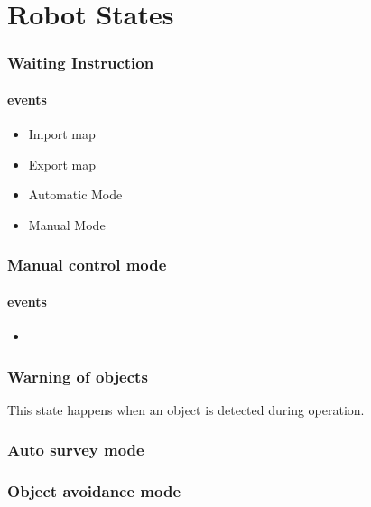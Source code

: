 \documentclass[10pt,a4paper]{article}
\begin{document}
\part{Robot States}
\section{Waiting Instruction}
\subsection{events}
\begin{itemize}
\item Import map
\item Export map
\item Automatic Mode
\item Manual Mode	
\end{itemize}
\section{Manual control mode}
\subsection {events}
\begin{itemize}
\item 
\end{itemize}
\section{Warning of objects}
This state happens when an object is detected during operation.
\section{Auto survey mode}
\section{Object avoidance mode}
\end{document}
